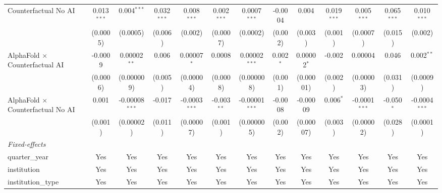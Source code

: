 \begin{tabular}{lcccccccccccc}
   Counterfactual No AI                     & 0.013$^{***}$  & 0.004$^{***}$    & 0.032$^{***}$  & 0.008$^{***}$   & 0.002$^{***}$  & 0.0007$^{***}$   & -0.0004        & 0.004          & 0.019$^{***}$ & 0.005$^{***}$   & 0.065$^{***}$  & 0.010$^{***}$\\   
                                            & (0.0005)       & (0.0005)         & (0.006)        & (0.002)         & (0.0007)       & (0.0002)         & (0.002)        & (0.003)        & (0.001)       & (0.0007)        & (0.015)        & (0.002)\\   
   AlphaFold $\times$ Counterfactual AI     & -0.0009        & 0.00002$^{**}$   & 0.006          & 0.00007$^{*}$   & 0.0008         & 0.00002$^{***}$  & 0.002$^{*}$    & 0.00002$^{*}$  & -0.002        & 0.00004         & 0.046          & 0.002$^{**}$\\   
                                            & (0.0006)       & (0.000009)       & (0.005)        & (0.00004)       & (0.0008)       & (0.000008)       & (0.001)        & (0.00001)      & (0.002)       & (0.00003)       & (0.031)        & (0.0009)\\   
   AlphaFold $\times$ Counterfactual No AI  & 0.001          & -0.00008$^{***}$ & -0.017         & -0.0003$^{***}$ & -0.003$^{**}$  & -0.00001$^{***}$ & -0.0008        & -0.00009       & 0.006$^{*}$   & -0.0001$^{***}$ & -0.050$^{*}$   & -0.0004$^{***}$\\   
                                            & (0.001)        & (0.00002)        & (0.011)        & (0.00007)       & (0.001)        & (0.000005)       & (0.002)        & (0.00007)      & (0.003)       & (0.00002)       & (0.028)        & (0.0001)\\   
   \midrule
   \emph{Fixed-effects}\\
   quarter\_year                            & Yes            & Yes              & Yes            & Yes             & Yes            & Yes              & Yes            & Yes            & Yes           & Yes             & Yes            & Yes\\  
   institution                              & Yes            & Yes              & Yes            & Yes             & Yes            & Yes              & Yes            & Yes            & Yes           & Yes             & Yes            & Yes\\  
   institution\_type                        & Yes            & Yes              & Yes            & Yes             & Yes            & Yes              & Yes            & Yes            & Yes           & Yes             & Yes            & Yes\\  

\end{tabular}

